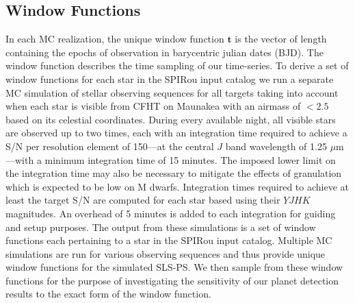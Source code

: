 \subsection{Window Functions} \label{BSsect:wf}
In each MC realization, the unique window function $\mathbf{t}$ is the vector of length \nobs{} containing
the epochs of observation in barycentric julian dates (BJD). The window function describes the time sampling of
our time-series. To derive a set of window functions for each star in the SPIRou input catalog
we run a separate MC simulation of stellar observing sequences for all targets taking into account
when each
star is visible from CFHT on Maunakea with an airmass of $<2.5$ based on its celestial coordinates.
During every available night, all visible stars are observed up to two times,
each with an integration time required to achieve a
S/N per resolution element of 150---at the central $J$ band wavelength of 1.25 $\mu$m---with a minimum integration
time of 15 minutes. The imposed lower limit on the
integration time may also be necessary to mitigate the effects of granulation \citep{lovis05} which is
expected to be low on M dwarfs. 
Integration times required to achieve at least the target S/N are computed for
each star based using their $YJHK$ magnitudes. An overhead of 5 minutes is added to each
integration for guiding and setup purposes.
The output from these simulations is a set of window functions each pertaining to a star in the
SPIRou input catalog. Multiple MC simulations are run for various observing
sequences and thus provide unique window functions for the simulated SLS-PS. We then sample from
these window functions for the purpose of investigating
the sensitivity of our planet detection results to the exact form of the window function.

